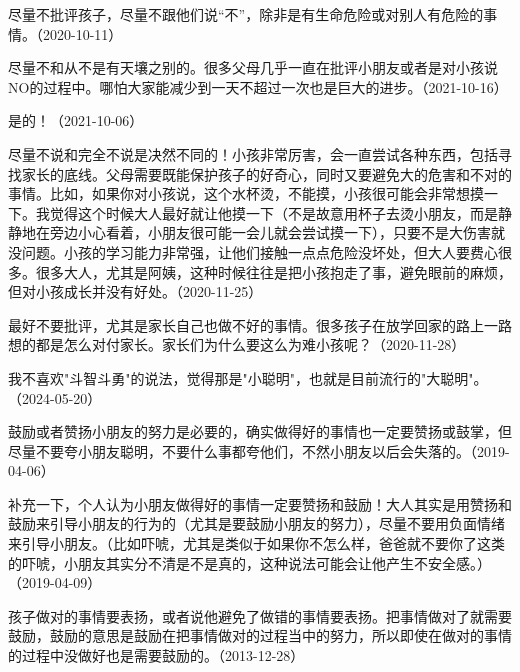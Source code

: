 尽量不批评孩子，尽量不跟他们说“不”，除非是有生命危险或对别人有危险的事情。（2020-10-11）


尽量不和从不是有天壤之别的。很多父母几乎一直在批评小朋友或者是对小孩说NO的过程中。哪怕大家能减少到一天不超过一次也是巨大的进步。（2021-10-16）


是的！（2021-10-06）


尽量不说和完全不说是决然不同的！小孩非常厉害，会一直尝试各种东西，包括寻找家长的底线。父母需要既能保护孩子的好奇心，同时又要避免大的危害和不对的事情。比如，如果你对小孩说，这个水杯烫，不能摸，小孩很可能会非常想摸一下。我觉得这个时候大人最好就让他摸一下（不是故意用杯子去烫小朋友，而是静静地在旁边小心看着，小朋友很可能一会儿就会尝试摸一下），只要不是大伤害就没问题。小孩的学习能力非常强，让他们接触一点点危险没坏处，但大人要费心很多。很多大人，尤其是阿姨，这种时候往往是把小孩抱走了事，避免眼前的麻烦，但对小孩成长并没有好处。（2020-11-25）


最好不要批评，尤其是家长自己也做不好的事情。很多孩子在放学回家的路上一路想的都是怎么对付家长。家长们为什么要这么为难小孩呢？（2020-11-28）


我不喜欢"斗智斗勇"的说法，觉得那是"小聪明"，也就是目前流行的"大聪明"。（2024-05-20）


鼓励或者赞扬小朋友的努力是必要的，确实做得好的事情也一定要赞扬或鼓掌，但尽量不要夸小朋友聪明，不要什么事都夸他们，不然小朋友以后会失落的。（2019-04-06）

补充一下，个人认为小朋友做得好的事情一定要赞扬和鼓励！大人其实是用赞扬和鼓励来引导小朋友的行为的（尤其是要鼓励小朋友的努力），尽量不要用负面情绪来引导小朋友。（比如吓唬，尤其是类似于如果你不怎么样，爸爸就不要你了这类的吓唬，小朋友其实分不清是不是真的，这种说法可能会让他产生不安全感。）（2019-04-09）

孩子做对的事情要表扬，或者说他避免了做错的事情要表扬。把事情做对了就需要鼓励，鼓励的意思是鼓励在把事情做对的过程当中的努力，所以即使在做对的事情的过程中没做好也是需要鼓励的。（2013-12-28）

